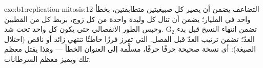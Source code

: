 \begin{solution}{exo:b1:replication-mitosis:12}
التضاعف يضمن أن يصير كل  صبيغيتين متطابقتين، بخطأ واحد في
المليار؛  يضمن أن تنال كل وليدة واحدة من كل زوج، بربط كل 
من القطبين وحبس الطور الانفصالي حتى يكون كل واحد تحت شد. 
G$_2$ تضمن انتهاء النسخ قبل بدء العدّ؛   تضمن ترتيب
العدّ قبل الفصل.  التي تفرز فرزًا خاطئًا تنتهي  زائد أو
ناقص (اختلال الصيغة): أي نسخة صحيحة حرفًا حرفًا، مسلَّمة إلى العنوان
الخطأ --- وهذا يقتل معظم تلك  ويميز معظم السرطانات.
\end{solution}

